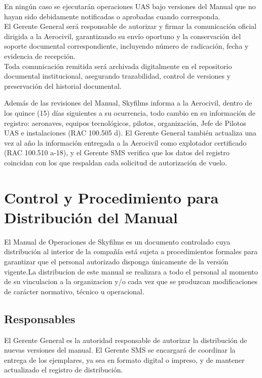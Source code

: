 En ningún caso se ejecutarán operaciones UAS bajo versiones del Manual que no hayan sido debidamente notificadas o aprobadas cuando corresponda.\\

El Gerente General será responsable de autorizar y firmar la comunicación oficial dirigida a la Aerocivil, garantizando su envío oportuno y la conservación del soporte documental correspondiente, incluyendo número de radicación, fecha y evidencia de recepción.\\

Toda comunicación remitida será archivada digitalmente en el repositorio documental institucional, asegurando trazabilidad, control de versiones y preservación del historial documental.

Además de las revisiones del Manual, Skyfilms informa a la Aerocivil, dentro de los quince (15) días siguientes a su ocurrencia, todo cambio en su información de registro: aeronaves, equipos tecnológicos, pilotos, organización, Jefe de Pilotos UAS e instalaciones (RAC 100.505 d). El Gerente General también actualiza una vez al año la información entregada a la Aerocivil como explotador certificado (RAC 100.510 a-18), y el Gerente SMS verifica que los datos del registro coincidan con los que respaldan cada solicitud de autorización de vuelo.







\section{Control y Procedimiento para Distribución del Manual}

El Manual de Operaciones de Skyfilms es un documento controlado cuya distribución al interior de la compañía está sujeta a procedimientos formales para garantizar que el personal autorizado disponga únicamente de la versión vigente.La distribucion de este manual se realizara a todo el personal al momento de su vinculacion a la organizacion y/o cada vez que se produzcan modificaciones de carácter normativo, técnico u operacional.

\subsection*{Responsables}
El Gerente General es la autoridad responsable de autorizar la distribución de nuevas versiones del manual. El Gerente SMS se encargará de coordinar la entrega de los ejemplares, ya sea en formato digital o impreso, y de mantener actualizado el registro de distribución.

